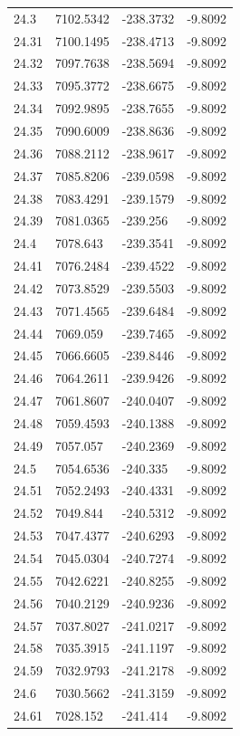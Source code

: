 \begin{table}[H]
\begin{tabular}{llll}
24.3 & 7102.5342 & -238.3732 & -9.8092 \\
24.31 & 7100.1495 & -238.4713 & -9.8092 \\
24.32 & 7097.7638 & -238.5694 & -9.8092 \\
24.33 & 7095.3772 & -238.6675 & -9.8092 \\
24.34 & 7092.9895 & -238.7655 & -9.8092 \\
24.35 & 7090.6009 & -238.8636 & -9.8092 \\
24.36 & 7088.2112 & -238.9617 & -9.8092 \\
24.37 & 7085.8206 & -239.0598 & -9.8092 \\
24.38 & 7083.4291 & -239.1579 & -9.8092 \\
24.39 & 7081.0365 & -239.256 & -9.8092 \\
24.4 & 7078.643 & -239.3541 & -9.8092 \\
24.41 & 7076.2484 & -239.4522 & -9.8092 \\
24.42 & 7073.8529 & -239.5503 & -9.8092 \\
24.43 & 7071.4565 & -239.6484 & -9.8092 \\
24.44 & 7069.059 & -239.7465 & -9.8092 \\
24.45 & 7066.6605 & -239.8446 & -9.8092 \\
24.46 & 7064.2611 & -239.9426 & -9.8092 \\
24.47 & 7061.8607 & -240.0407 & -9.8092 \\
24.48 & 7059.4593 & -240.1388 & -9.8092 \\
24.49 & 7057.057 & -240.2369 & -9.8092 \\
24.5 & 7054.6536 & -240.335 & -9.8092 \\
24.51 & 7052.2493 & -240.4331 & -9.8092 \\
24.52 & 7049.844 & -240.5312 & -9.8092 \\
24.53 & 7047.4377 & -240.6293 & -9.8092 \\
24.54 & 7045.0304 & -240.7274 & -9.8092 \\
24.55 & 7042.6221 & -240.8255 & -9.8092 \\
24.56 & 7040.2129 & -240.9236 & -9.8092 \\
24.57 & 7037.8027 & -241.0217 & -9.8092 \\
24.58 & 7035.3915 & -241.1197 & -9.8092 \\
24.59 & 7032.9793 & -241.2178 & -9.8092 \\
24.6 & 7030.5662 & -241.3159 & -9.8092 \\
24.61 & 7028.152 & -241.414 & -9.8092 \\

\end{tabular}
\end{table}
